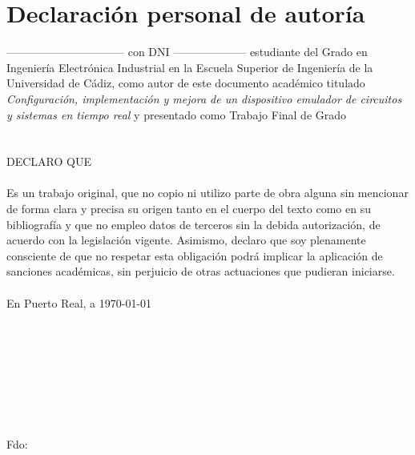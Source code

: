 \documentclass[a4paper,openright,12pt]{book}
\begin{document}
\begin{titlepage}
\newlength{\originalVOffset}
 \newlength{\originalHOffset}
 \setlength{\originalVOffset}{\voffset}   
 \setlength{\originalHOffset}{\hoffset}

 \setlength{\voffset}{0cm}
 \setlength{\hoffset}{0cm}
 
 \setlength{\voffset}{\originalVOffset}
 \setlength{\hoffset}{\originalHOffset}
\end{titlepage}

\begin{titlepage}
 \setlength{\voffset}{0cm}
 \setlength{\hoffset}{0cm}
 
 \setlength{\voffset}{\originalVOffset}
 \setlength{\hoffset}{\originalHOffset}
\end{titlepage}

\chapter*{Declaración personal de autoría}
\thispagestyle{empty}
--------------------------------  con DNI  --------------------  estudiante del Grado en Ingeniería Electrónica Industrial en la Escuela Superior de Ingeniería de la Universidad de Cádiz, como autor de este documento académico titulado \textit{Configuración, implementación y mejora de un dispositivo emulador de circuitos y sistemas en tiempo real} y presentado como Trabajo Final de Grado
\\\\\\
DECLARO QUE\\\\
Es un trabajo original, que no copio ni utilizo parte de obra alguna sin mencionar de forma clara y precisa su origen tanto en el cuerpo del texto como en su bibliografía y que no empleo datos de terceros sin la debida autorización, de acuerdo con la legislación vigente. Asimismo, declaro que soy plenamente consciente de que no respetar esta obligación podrá implicar la aplicación de sanciones académicas, sin perjuicio de otras actuaciones que pudieran iniciarse.
\\\\
En Puerto Real, a \today
\\\\\\\\\\\\\\\\\\
Fdo: 
\end{document}

